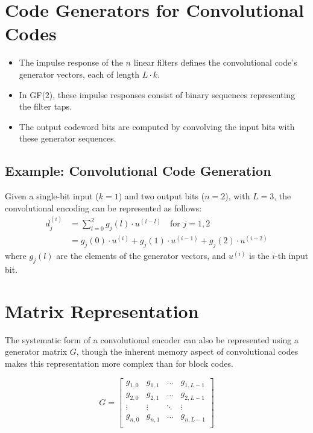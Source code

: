 \section*{Code Generators for Convolutional Codes}

\begin{itemize}
    \item The impulse response of the \(n\) linear filters defines the convolutional code's generator vectors, each of length \(L\cdot k\).
    \item In GF(2), these impulse responses consist of binary sequences representing the filter taps.
    \item The output codeword bits are computed by convolving the input bits with these generator sequences.
\end{itemize}

\subsection*{Example: Convolutional Code Generation}
Given a single-bit input (\(k=1\)) and two output bits (\(n=2\)), with \(L=3\), the convolutional encoding can be represented as follows:
\begin{align*}
    d^{(i)}_j &= \sum_{l=0}^{2} g_j(l)\cdot u^{(i-l)} \quad \text{for } j = 1,2 \\
    &= g_j(0)\cdot u^{(i)} + g_j(1)\cdot u^{(i-1)} + g_j(2)\cdot u^{(i-2)}
\end{align*}
where \(g_j(l)\) are the elements of the generator vectors, and \(u^{(i)}\) is the \(i\)-th input bit.

\section*{Matrix Representation}
The systematic form of a convolutional encoder can also be represented using a generator matrix \(G\), though the inherent memory aspect of convolutional codes makes this representation more complex than for block codes.

\[
G = 
\begin{bmatrix}
    g_{1,0} & g_{1,1} & \dots & g_{1,L-1} \\
    g_{2,0} & g_{2,1} & \dots & g_{2,L-1} \\
    \vdots  & \vdots  & \ddots & \vdots    \\
    g_{n,0} & g_{n,1} & \dots & g_{n,L-1} \\
\end{bmatrix}
\]


